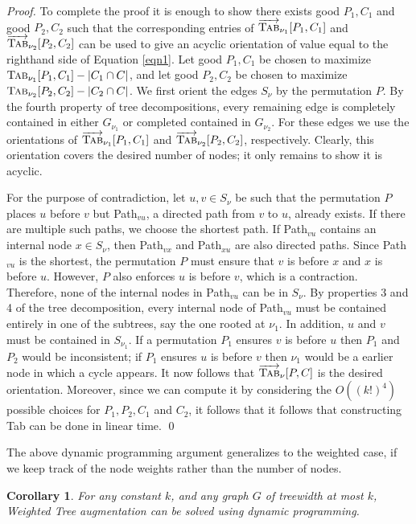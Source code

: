 \documentclass{article}
\newtheorem{cor}[theorem]{Corollary}
\newcommand{\ora}{\overrightarrow}
\begin{document}
\begin{proof}
To complete the proof it is enough to show there exists good $P_1, C_1$ and good $P_2, C_2$ such that the corresponding entries of $\ora {\mbox{\sc Tab}}_{\nu_1}[P_1,C_1]$ and $\ora {\mbox{\sc Tab}}_{\nu_2}[P_2,C_2]$ can be used to give an acyclic orientation of value equal to the righthand side of Equation \ref{eqn1}.
Let good $P_1,C_1$ be chosen to maximize ${\mbox{\sc Tab}}_{\nu_1}[P_1,C_1] - |C_1 \cap C|$, and let good $P_2,C_2$ be chosen to maximize ${\mbox{\sc Tab}}_{\nu_2}[P_2,C_2] - |C_2 \cap C|$.
We first orient the edges $S_\nu$ by the permutation $P$.  
By the fourth property of tree decompositions, every remaining edge is completely contained in either $G_{\nu_1}$ or completed contained in $G_{\nu_2}$.
For these edges we use the orientations of $\ora {\mbox{\sc Tab}}_{\nu_1}[P_1,C_1]$ and $\ora {\mbox{\sc Tab}}_{\nu_2}[P_2,C_2]$, respectively.  
Clearly, this orientation covers the desired number of nodes; it only remains to show it is acyclic.  

For the purpose of contradiction, let $u,v \in S_\nu$ be such that the permutation $P$ places $u$ before $v$ but {\sc Path}$_{vu}$, a directed path from $v$ to $u$, already exists. 
If there are multiple such paths, we choose the shortest path.
If {\sc Path}$_{vu}$ contains an internal node $x\in S_{\nu}$, then
{\sc Path}$_{vx}$ and {\sc Path}$_{xu}$ are also directed paths. Since
{\sc Path}$_{vu}$ is the shortest, the permutation $P$ must ensure that $v$ is before $x$ and $x$ is before $u$. However, $P$ also enforces $u$ is before
$v$, which is a contraction.
Therefore, none of the internal nodes in {\sc Path}$_{vu}$ can be in
$S_{\nu}$. By properties 3 and 4 of the tree decomposition, every
internal node of {\sc Path}$_{vu}$ must be contained entirely in one
of the subtrees, say the one rooted at $\nu_1$. In addition, $u$ and
$v$ must be contained in $S_{\nu_1}$.  If a permutation
$P_1$ ensures $v$ is before $u$ then $P_1$ and $P_2$ would be
inconsistent; if $P_1$ ensures $u$ is before $v$ then $\nu_1$ would be a
earlier node in which a cycle appears.
It now follows that $\ora {\mbox{\sc Tab}}_{\nu}[P,C]$ is the desired orientation.
Moreover, since we can compute it by considering the $O((k!)^4)$ possible choices for $P_1,P_2, C_1$ and $C_2$, it follows that it follows that constructing {\sc Tab} can be done in linear time.
\qed 
\end{proof}
The above dynamic programming argument generalizes to the 
weighted case, if we keep track of the node weights rather than 
the number of nodes.
\begin{cor}
For any constant $k$, and any graph $G$ of treewidth at most $k$,
{\sc Weighted Tree augmentation} 
can be solved using dynamic programming.
\end{cor}
\end{document}
